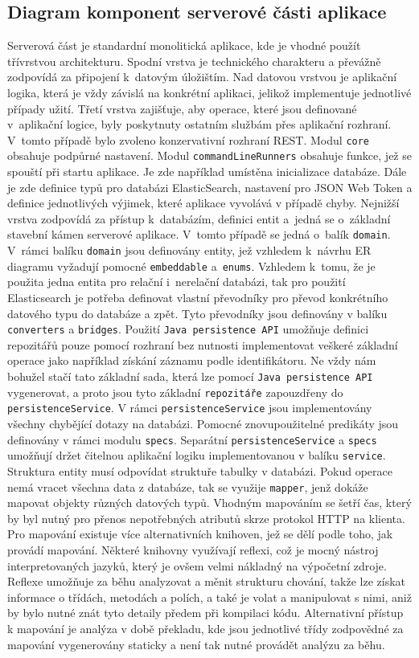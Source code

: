 \subsection{Diagram komponent serverové části aplikace}
Serverová část je standardní monolitická aplikace, kde je vhodné použít třívrstvou architekturu. Spodní vrstva je technického charakteru a převážně zodpovídá za připojení k~datovým úložištím. Nad datovou vrstvou je aplikační logika, která je vždy závislá na konkrétní aplikaci, jelikož implementuje jednotlivé případy užití. Třetí vrstva zajišťuje, aby operace, které jsou definované v~aplikační logice, byly poskytnuty ostatním službám přes aplikační rozhraní. V~tomto případě bylo zvoleno konzervativní rozhraní REST. 
\newpara
Modul \texttt{core} obsahuje podpůrné nastavení. Modul \texttt{commandLineRunners} obsahuje funkce, jež se spouští při startu aplikace. Je zde například umístěna inicializace databáze. Dále je zde definice typů pro databázi ElasticSearch, nastavení pro JSON Web Token a definice jednotlivých výjimek, které aplikace vyvolává v případě chyby. 
\newpara
Nejnižší vrstva zodpovídá za přístup k~databázím, definici entit a~jedná se o~základní stavební kámen serverové aplikace. V~tomto případě se jedná o~balík \texttt{domain}. V~rámci balíku \texttt{domain} jsou definovány entity, jež vzhledem k~návrhu ER diagramu vyžadují pomocné \texttt{embeddable} a~\texttt{enums}. Vzhledem k~tomu, že je použita jedna entita pro relační i~nerelační databázi, tak pro použití Elasticsearch je potřeba definovat vlastní převodníky pro převod konkrétního datového typu do databáze a zpět. Tyto převodníky jsou definovány v balíku \texttt{converters} a \texttt{bridges}. Použití \texttt{Java persistence API} umožňuje definici repozitářů pouze pomocí rozhraní bez nutnosti implementovat veškeré základní operace jako například získání záznamu podle identifikátoru. Ne vždy nám bohužel stačí tato základní sada, která lze pomocí \texttt{Java persistence API} vygenerovat, a proto jsou tyto základní \texttt{repozitáře} zapouzdřeny do \texttt{persistenceService}. V rámci \texttt{persistenceService} jsou implementovány všechny chybějící dotazy na databázi. Pomocné znovupoužitelné predikáty jsou definovány v rámci modulu \texttt{specs}.
\newpara
Separátní \texttt{persistenceService} a \texttt{specs} umožňují držet čitelnou aplikační logiku implementovanou v balíku \texttt{service}. Struktura entity musí odpovídat struktuře tabulky v databázi. Pokud operace nemá vracet všechna data z databáze, tak se využije \texttt{mapper}, jenž dokáže mapovat objekty různých datových typů. Vhodným mapováním se šetří čas, který by byl nutný pro přenos nepotřebných atributů skrze protokol HTTP na klienta. Pro mapování existuje více alternativních knihoven, jež se dělí podle toho, jak provádí mapování. Některé knihovny využívají reflexi, což je mocný nástroj interpretovaných jazyků, který je ovšem velmi nákladný na výpočetní zdroje. Reflexe umožňuje za běhu analyzovat a měnit strukturu chování, takže lze získat informace o třídách, metodách a polích, a také je volat a manipulovat s nimi, aniž by bylo nutné znát tyto detaily předem při kompilaci kódu. Alternativní přístup k mapování je analýza v době překladu, kde jsou jednotlivé třídy zodpovědné za mapování vygenerovány staticky a není tak nutné provádět analýzu za běhu.
